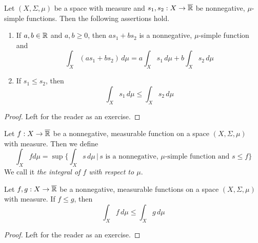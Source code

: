\begin{fact}\label{fact:basics_for_simple_functions}
Let $(X,\Sigma,\mu)$ be a space with measure and $s_1, s_2:X\rightarrow \overline{{\mathbb R}}$ be nonnegative, $\mu$-simple functions. Then the following assertions hold.
\begin{enumerate}[label=\emph{\textbf{(\arabic*)}}, leftmargin=*]
\item If $a, b\in {\mathbb R}$ and $a, b\geq 0$, then $a s_1 + b s_2$ is a nonnegative, $\mu$-simple function and 
$$\int_X\left(a s_1 + b s_2\right)\,d\mu = a \int_Xs_1\,d\mu + b \int_Xs_2\,d\mu$$
\item If $s_1\leq s_2$, then
$$\int_Xs_1\,d\mu \leq \int_Xs_2\,d\mu$$
\end{enumerate}
\end{fact}
\begin{proof}
Left for the reader as an exercise.
\end{proof}

\begin{definition}
Let $f:X\rightarrow \overline{{\mathbb R}}$ be a nonnegative, measurable function on a space $(X,\Sigma,\mu)$ with measure. Then we define 
$$\int_X f d\mu = \sup\bigg\{\int_X s\, d\mu\,\bigg|\,s\mbox{ is a nonnegative, }\mu\mbox{-simple function and }s\leq f\bigg\}$$
We call it \textit{the integral of $f$ with respect to $\mu$}.
\end{definition}

\begin{fact}\label{fact:integral_is_monotone}
Let $f,g:X\rightarrow \overline{{\mathbb R}}$ be a nonnegative, measurable functions on a space $(X,\Sigma,\mu)$ with measure. If $f\leq g$, then
$$\int_Xf\,d\mu \leq \int_Xg\,d\mu$$
\end{fact}
\begin{proof}
Left for the reader as an exercise.
\end{proof}

